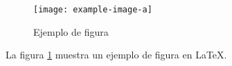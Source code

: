 \documentclass{article}
\begin{document}
\begin{figure}[h]
\centering
\texttt{[image: example-image-a]}
\caption{Ejemplo de figura}
\label{fig:ejemplo}
\end{figure}
La figura \ref{fig:ejemplo} muestra un ejemplo de figura en LaTeX.
\end{document}
